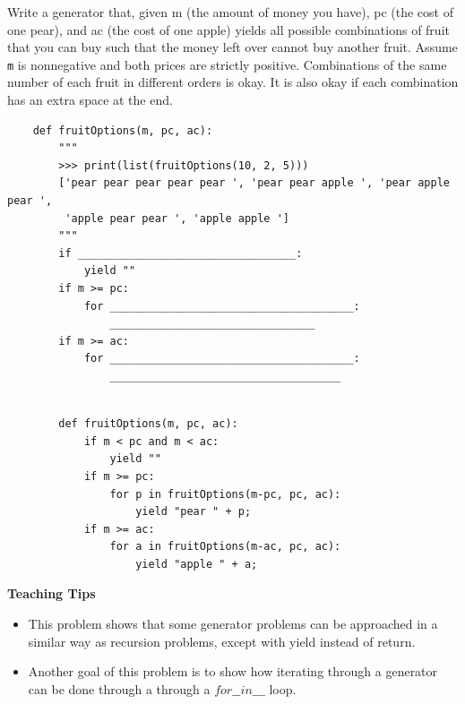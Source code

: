 \begin{blocksection}
    \question Write a generator that, given m (the amount of money you have), pc (the cost of one pear), and ac (the cost of one apple)
    yields all possible combinations of fruit that you can buy such that the money left over cannot buy another fruit.
    Assume \lstinline{m} is nonnegative and both prices are strictly positive. Combinations of the same number of each fruit in different orders is okay.
    It is also okay if each combination has an extra space at the end.
    
    \begin{lstlisting}
    def fruitOptions(m, pc, ac):
        """
        >>> print(list(fruitOptions(10, 2, 5)))
        ['pear pear pear pear pear ', 'pear pear apple ', 'pear apple pear ',
         'apple pear pear ', 'apple apple ']
        """
        if __________________________________:
            yield ""
        if m >= pc:
            for ______________________________________:
                ________________________________
        if m >= ac:
            for ______________________________________:
                ____________________________________
                
    \end{lstlisting}
    
    \begin{solution}[1in]
    \begin{lstlisting}
        def fruitOptions(m, pc, ac): 
            if m < pc and m < ac:
                yield ""
            if m >= pc:
                for p in fruitOptions(m-pc, pc, ac):
                    yield "pear " + p;
            if m >= ac:
                for a in fruitOptions(m-ac, pc, ac):
                    yield "apple " + a;    
    \end{lstlisting}
    \end{solution}
    \end{blocksection}
    
    \begin{guide}
    \begin{blocksection}
        \textbf{Teaching Tips}
        \begin{itemize}
        \item This problem shows that some generator problems can be approached in a similar way as recursion problems, except with yield instead of return.
        \item Another goal of this problem is to show how iterating through a generator can be done through a through a $for \_\_ in \_\_\_$ loop.
        \end{itemize}
    \end{blocksection}
    \end{guide}